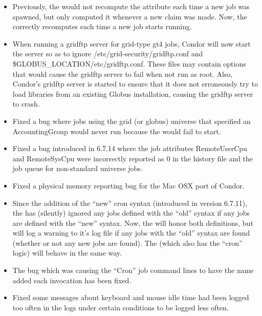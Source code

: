 \begin{itemize}

\item Previously, the  would not recompute the
   attribute each time a new job was spawned, but
  only computed it whenever a new claim was made.
  Now, the  correctly recomputes 
  each time a new job starts running.

\item When running a gridftp server for grid-type gt4 jobs, Condor will now
start the server so as to ignore /etc/grid-security/gridftp.conf and
\$GLOBUS\_LOCATION/etc/gridftp.conf. These files may contain options that
would cause the gridftp server to fail when not run as root.  Also, Condor's gridftp server is started to ensure that it does not erroneously try to load libraries from an existing Globus installation, causing the gridftp server to crash.

\item Fixed a bug where jobs using the grid (or globus) universe that specified
an AccountingGroup would never run because the  would fail
to start.

\item Fixed a bug introduced in 6.7.14 where the job attributes RemoteUserCpu 
and RemoteSysCpu were incorrectly reported as 0 in the history file and the job queue
for non-standard universe jobs.

\item Fixed a physical memory reporting bug for the Mac OSX port of Condor.

\item Since the addition of the ``new'' cron syntax (introduced in
version 6.7.11), the  has (silently) ignored any jobs
defined with the ``old'' syntax if any jobs are defined with the
``new'' syntax.  Now, the  will honor both definitions,
but will log a warning to it's log file if any jobs with the ``old''
syntax are found (whether or not any new jobs are found).
The  (which also has the ``cron'' logic) will behave in
the same way.

\item The bug which was causing the ``Cron'' job command lines to have
the name added each invocation has been fixed.

\item Fixed some messages about keyboard and mouse idle time had been logged
too often in the  logs under certain conditions to be logged
less often.


\end{itemize}
